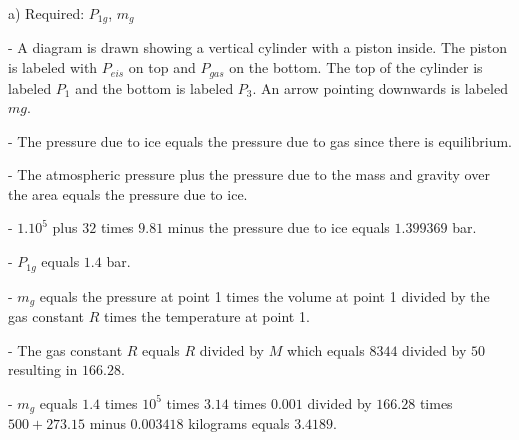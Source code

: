 a) Required: \(P_{1g}\), \(m_g\)

- A diagram is drawn showing a vertical cylinder with a piston inside. The piston is labeled with \(P_{eis}\) on top and \(P_{gas}\) on the bottom. The top of the cylinder is labeled \(P_1\) and the bottom is labeled \(P_3\). An arrow pointing downwards is labeled \(mg\).

- The pressure due to ice equals the pressure due to gas since there is equilibrium.

- The atmospheric pressure plus the pressure due to the mass and gravity over the area equals the pressure due to ice.

- \(1.10^5\) plus \(32\) times \(9.81\) minus the pressure due to ice equals \(1.399369\) bar.

- \(P_{1g}\) equals \(1.4\) bar.

- \(m_g\) equals the pressure at point 1 times the volume at point 1 divided by the gas constant \(R\) times the temperature at point 1.

- The gas constant \(R\) equals \(R\) divided by \(M\) which equals \(8344\) divided by \(50\) resulting in \(166.28\).

- \(m_g\) equals \(1.4\) times \(10^5\) times \(3.14\) times \(0.001\) divided by \(166.28\) times \(500 + 273.15\) minus \(0.003418\) kilograms equals \(3.4189\).